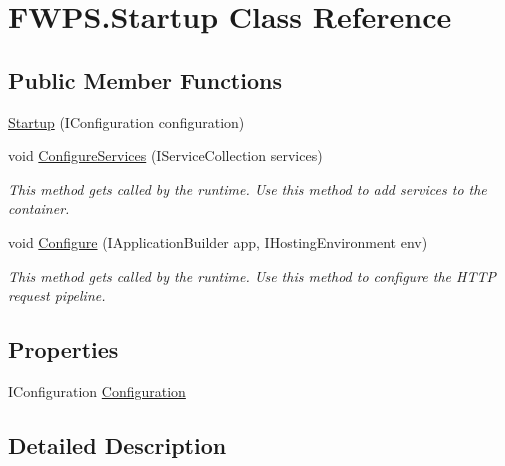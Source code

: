\hypertarget{class_f_w_p_s_1_1_startup}{}\section{F\+W\+P\+S.\+Startup Class Reference}
\label{class_f_w_p_s_1_1_startup}
\subsection*{Public Member Functions}
\begin{DoxyCompactItemize}
\item 
\mbox{\hyperlink{class_f_w_p_s_1_1_startup_afd871a5956ab61fc598099dc6f3c6a39}{Startup}} (I\+Configuration configuration)
\item 
void \mbox{\hyperlink{class_f_w_p_s_1_1_startup_ae36d133d440c4c5d79e4661c3b971f3e}{Configure\+Services}} (I\+Service\+Collection services)
\begin{DoxyCompactList}\small\item\em This method gets called by the runtime. Use this method to add services to the container. \end{DoxyCompactList}\item 
void \mbox{\hyperlink{class_f_w_p_s_1_1_startup_aa583f17e9347665fd84de6d6affa9fc1}{Configure}} (I\+Application\+Builder app, I\+Hosting\+Environment env)
\begin{DoxyCompactList}\small\item\em This method gets called by the runtime. Use this method to configure the H\+T\+TP request pipeline. \end{DoxyCompactList}\end{DoxyCompactItemize}
\subsection*{Properties}
\begin{DoxyCompactItemize}
\item 
I\+Configuration \mbox{\hyperlink{class_f_w_p_s_1_1_startup_af083878e6522dc850f64df1e9d489e09}{Configuration}}
\end{DoxyCompactItemize}


\subsection{Detailed Description}


